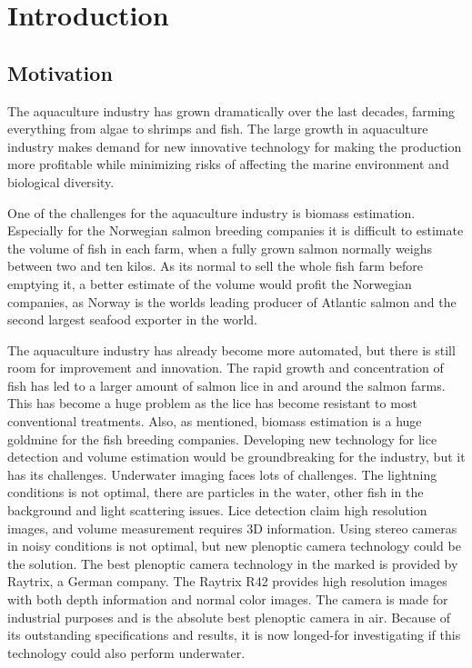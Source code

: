 \section{Introduction}\label{introduction}

\subsection{Motivation}\label{motivation}

The aquaculture industry has grown dramatically over the last decades, farming everything from algae to shrimps and fish. The large growth in aquaculture industry makes demand for new innovative technology for making the production more profitable while minimizing risks of affecting the marine environment and biological diversity.\cite{website:aquaculture}

One of the challenges for the aquaculture industry is biomass estimation. Especially for the Norwegian salmon breeding companies it is difficult to estimate the volume of fish in each farm, when a fully grown salmon normally weighs between two and ten kilos.\cite{website:biomass} As its normal to sell the whole fish farm before emptying it, a better estimate of the volume would profit the Norwegian companies, as Norway is the worlds leading producer of Atlantic salmon and the second largest seafood exporter in the world.\cite{website:aquaculture}

The aquaculture industry has already become more automated, but there is still room for improvement and innovation. The rapid growth and concentration of fish has led to a larger amount of salmon lice in and around the salmon farms. This has become a huge problem as the lice has become resistant to most conventional treatments. Also, as mentioned, biomass estimation is a huge goldmine for the fish breeding companies. Developing new technology for lice detection and volume estimation would be groundbreaking for the industry, but it has its challenges.
Underwater imaging faces lots of challenges. The lightning conditions is not optimal, there are particles in the water, other fish in the background and light scattering issues. Lice detection claim high resolution images, and volume measurement requires 3D information. Using stereo cameras in noisy conditions is not optimal, but new plenoptic camera technology could be the solution. The best plenoptic camera technology in the marked is provided by Raytrix, a German company.\cite{article:plenoptic_camera} The Raytrix R42 provides high resolution images with both depth information and normal color images. The camera is made for industrial purposes and is the absolute best plenoptic camera in air. Because of its outstanding specifications and results, it is now longed-for investigating if this technology could also perform underwater. 

